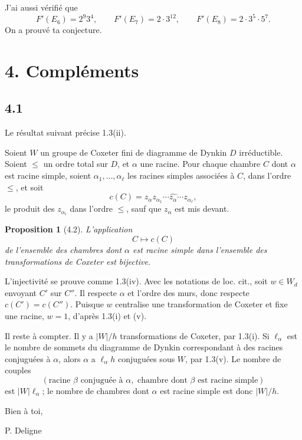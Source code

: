 \documentclass[11pt]{article}
\theoremstyle{plainfr}
\newtheorem*{proposition}{Proposition}
\begin{document}
J'ai aussi vérifié que
\[
 F'(E_6)=2^9 3^4,
 \qquad F'(E_7)=2\cdot 3^{12},
 \qquad F'(E_8)=2\cdot 3^5\cdot 5^7.
\]
On a prouvé ta conjecture.

\section*{4. Compléments}

\subsection*{4.1}
Le résultat suivant précise 1.3(ii).

Soient $W$ un groupe de Coxeter fini de diagramme de Dynkin $D$ irréductible. Soient $\leq$ un ordre total sur $D$, et $\alpha$ une racine. Pour chaque chambre $C$ dont $\alpha$ est racine simple, soient $\alpha_1,\ldots,\alpha_\ell$ les racines simples associées à $C$, dans l'ordre $\leq$, et soit
\[
 c(C)=z_\alpha z_{\alpha_1}\cdots \widehat{z_\alpha}\cdots z_{\alpha_\ell},
\]
le produit des $z_{\alpha_i}$ dans l'ordre $\leq$, sauf que $z_\alpha$ est mis devant.

\begin{proposition}[4.2]
L'application
\[
 C\longmapsto c(C)
\]
de l'ensemble des chambres dont $\alpha$ est racine simple dans l'ensemble des transformations de Coxeter est bijective.
\end{proposition}

L'injectivité se prouve comme 1.3(iv). Avec les notations de loc. cit., soit $w\in W_d$ envoyant $C'$ sur $C''$. Il respecte $\alpha$ et l'ordre des murs, donc respecte $c(C')=c(C'')$. Puisque $w$ centralise une transformation de Coxeter et fixe une racine, $w=1$, d'après 1.3(i) et (v).

Il reste à compter. Il y a $|W|/h$ transformations de Coxeter, par 1.3(i). Si $\ell_\alpha$ est le nombre de sommets du diagramme de Dynkin correspondant à des racines conjuguées à $\alpha$, alors $\alpha$ a $\ell_\alpha h$ conjuguées sous $W$, par 1.3(v). Le nombre de couples
\[
(\text{racine }\beta\text{ conjuguée à }\alpha,
\text{ chambre dont }\beta\text{ est racine simple})
\]
est $|W|\ell_\alpha$; le nombre de chambres dont $\alpha$ est racine simple est donc $|W|/h$.

Bien à toi,

\hfill P. Deligne
\end{document}
